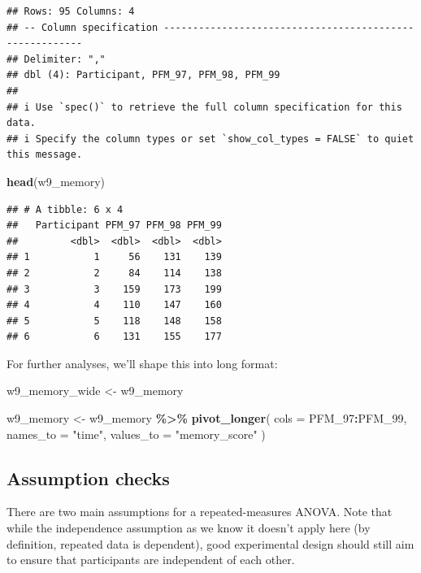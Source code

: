 \documentclass[
]{book}
\newenvironment{Shaded}{\begin{snugshade}}{\end{snugshade}}
\newcommand{\AttributeTok}[1]{\textcolor[rgb]{0.13,0.29,0.53}{#1}}
\newcommand{\FunctionTok}[1]{\textcolor[rgb]{0.13,0.29,0.53}{\textbf{#1}}}
\newcommand{\NormalTok}[1]{#1}
\newcommand{\OtherTok}[1]{\textcolor[rgb]{0.56,0.35,0.01}{#1}}
\newcommand{\SpecialCharTok}[1]{\textcolor[rgb]{0.81,0.36,0.00}{\textbf{#1}}}
\newcommand{\StringTok}[1]{\textcolor[rgb]{0.31,0.60,0.02}{#1}}
\begin{document}
\begin{verbatim}
## Rows: 95 Columns: 4
## -- Column specification --------------------------------------------------------
## Delimiter: ","
## dbl (4): Participant, PFM_97, PFM_98, PFM_99
## 
## i Use `spec()` to retrieve the full column specification for this data.
## i Specify the column types or set `show_col_types = FALSE` to quiet this message.
\end{verbatim}

\begin{Shaded}
\begin{Highlighting}[]
\FunctionTok{head}\NormalTok{(w9\_memory)}
\end{Highlighting}
\end{Shaded}

\begin{verbatim}
## # A tibble: 6 x 4
##   Participant PFM_97 PFM_98 PFM_99
##         <dbl>  <dbl>  <dbl>  <dbl>
## 1           1     56    131    139
## 2           2     84    114    138
## 3           3    159    173    199
## 4           4    110    147    160
## 5           5    118    148    158
## 6           6    131    155    177
\end{verbatim}

For further analyses, we'll shape this into long format:

\begin{Shaded}
\begin{Highlighting}[]
\NormalTok{w9\_memory\_wide }\OtherTok{\textless{}{-}}\NormalTok{ w9\_memory}

\NormalTok{w9\_memory }\OtherTok{\textless{}{-}}\NormalTok{ w9\_memory }\SpecialCharTok{\%\textgreater{}\%}
  \FunctionTok{pivot\_longer}\NormalTok{(}
    \AttributeTok{cols =}\NormalTok{ PFM\_97}\SpecialCharTok{:}\NormalTok{PFM\_99,}
    \AttributeTok{names\_to =} \StringTok{"time"}\NormalTok{,}
    \AttributeTok{values\_to =} \StringTok{"memory\_score"}
\NormalTok{  )}
\end{Highlighting}
\end{Shaded}

\hypertarget{assumption-checks-4}{%
\subsection{Assumption checks}\label{assumption-checks-4}}

There are two main assumptions for a repeated-measures ANOVA. Note that while the independence assumption as we know it doesn't apply here (by definition, repeated data is dependent), good experimental design should still aim to ensure that participants are independent of each other.
\end{document}
